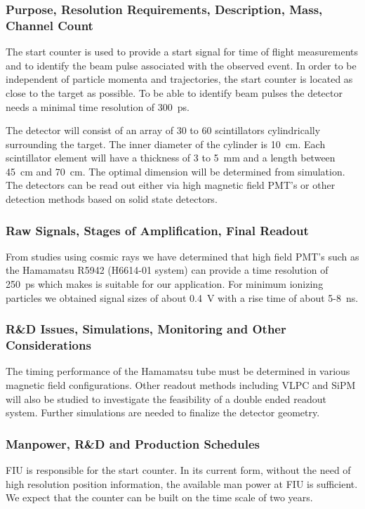 \subsubsection*{Purpose, Resolution Requirements, Description, Mass, Channel Count}
The start counter is used to provide a start signal for
time of flight measurements and to identify  the beam pulse associated
with the observed event. In order to be independent of particle momenta
and trajectories, the start counter is located as close to the target as
possible. To be able to identify beam pulses the detector
needs a minimal time resolution of 300~ps. 

The detector will consist of an array of 30 to 60 scintillators
cylindrically surrounding the target. The inner diameter of the
cylinder is 10~cm. Each scintillator element will have  
a thickness of 3 to 5~mm and a length between 45~cm and
70~cm. The optimal dimension will be determined from simulation. The
detectors can be read out either via high magnetic field PMT's or
other detection methods based on solid state detectors.     

\subsubsection*{Raw Signals, Stages of Amplification, Final Readout}
From studies using cosmic rays we have determined that high field
PMT's such as the Hamamatsu R5942 (H6614-01 system) can provide a time
resolution of 250~ps which makes is suitable for our application. For
minimum ionizing particles we obtained signal sizes of about 0.4~V
with a rise time of about 5-8~ns.

\subsubsection*{R\&D Issues, Simulations, Monitoring and Other Considerations}
The timing performance of the Hamamatsu tube must be determined in
various magnetic field configurations. Other readout methods including
VLPC and SiPM will also be studied to investigate the feasibility of a
double ended readout system. Further simulations are needed to finalize
the detector geometry.

\subsubsection*{Manpower, R\&D and Production Schedules}
FIU is responsible for the start counter. In its current form, without
the need of high resolution position information, the available man
power at FIU is sufficient.
We expect that the counter can be built on the time scale of two years.




